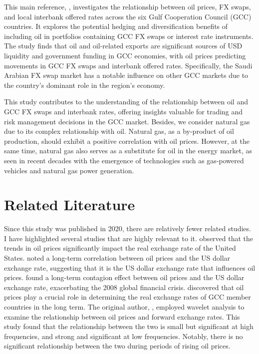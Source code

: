 \documentclass[12pt]{article}
\begin{document}
\begin{sloppypar}
This main reference, \textcite{almaskati2022oil}, investigates the relationship between oil prices, FX swaps, and local interbank offered rates across the six Gulf Cooperation Council (GCC) countries. It explores the potential hedging and diversification benefits of including oil in portfolios containing GCC FX swaps or interest rate instruments. The study finds that oil and oil-related exports are significant sources of USD liquidity and government funding in GCC economies, with oil prices predicting movements in GCC FX swaps and interbank offered rates. Specifically, the Saudi Arabian FX swap market has a notable influence on other GCC markets due to the country's dominant role in the region's economy.

This study contributes to the understanding of the relationship between oil and GCC FX swaps and interbank rates, offering insights valuable for trading and risk management decisions in the GCC market. Besides, we consider natural gas due to its complex relationship with oil. Natural gas, as a by-product of oil production, should exhibit a positive correlation with oil prices. However, at the same time, natural gas also serves as a substitute for oil in the energy market, as seen in recent decades with the emergence of technologies such as gas-powered vehicles and natural gas power generation.

\section{Related Literature}
Since this study was published in 2020, there are relatively fewer related studies. I have highlighted several studies that are highly relevant to it. \textcite{amano1998oil} observed that the trends in oil prices significantly impact the real exchange rate of the United States. \textcite{zhang2008spillover} noted a long-term correlation between oil prices and the US dollar exchange rate, suggesting that it is the US dollar exchange rate that influences oil prices. \textcite{reboredo2014oil} found a long-term contagion effect between oil prices and the US dollar exchange rate, exacerbating the 2008 global financial crisis. \textcite{eslamloueyan2015determinants} discovered that oil prices play a crucial role in determining the real exchange rates of GCC member countries in the long term. The original author, \textcite{almaskati2022wavelet}, employed wavelet analysis to examine the relationship between oil prices and forward exchange rates. This study found that the relationship between the two is small but significant at high frequencies, and strong and significant at low frequencies. Notably, there is no significant relationship between the two during periods of rising oil prices.


\end{sloppypar}
\end{document}
